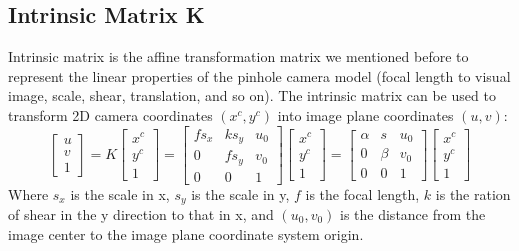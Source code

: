 \subsection{Intrinsic Matrix K}
Intrinsic matrix is the affine transformation matrix we mentioned before to represent the linear properties of the pinhole camera model (focal length to visual image, scale, shear, translation, and so on). The intrinsic matrix can be used to transform 2D camera coordinates $(x^c, y^c)$ into image plane coordinates $(u, v)$:
$$\left[\begin{array}{c} u \\ v \\ 1 \end{array}\right] = K\left[\begin{array}{c} x^c \\ y^c \\ 1 \end{array}\right] = \left[\begin{array}{ccc} f s_x & k s_y & u_0 \\0 & f s_y & v_0 \\ 0 & 0 & 1 \end{array}\right]\left[\begin{array}{c} x^c \\ y^c \\ 1 \end{array}\right] = \left[\begin{array}{ccc} \alpha & s & u_0 \\0 & \beta & v_0 \\ 0 & 0 & 1 \end{array}\right]\left[\begin{array}{c} x^c \\ y^c \\ 1 \end{array}\right]$$
Where $s_x$ is the scale in x, $s_y$ is the scale in y, $f$ is the focal length, $k$ is the ration of shear in the y direction to that in x, and $(u_0, v_0)$ is the distance from the image center to the image plane coordinate system origin. 
